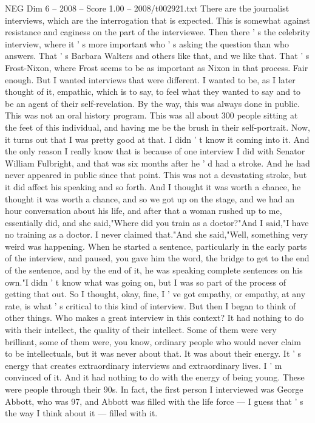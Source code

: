 \begin{textsample}{NEG Dim 6 – 2008 – Score 1.00 – 2008/t002921.txt}
There are the journalist interviews, which are the interrogation that is expected.
This is somewhat against resistance and caginess on the part of the interviewee.
Then there ' s the celebrity interview, where it ' s more important who ' s asking the question than who answers.
That ' s Barbara Walters and others like that, and we like that.
That ' s Frost-Nixon, where Frost seems to be as important as Nixon in that process.
Fair enough.
But I wanted interviews that were different.
I wanted to be, as I later thought of it, empathic, which is to say, to feel what they wanted to say and to be an agent of their self-revelation.
By the way, this was always done in public.
This was not an oral history program.
This was all about 300 people sitting at the feet of this individual, and having me be the brush in their self-portrait.
Now, it turns out that I was pretty good at that.
I didn ' t know it coming into it.
And the only reason I really know that is because of one interview I did with Senator William Fulbright, and that was six months after he ' d had a stroke.
And he had never appeared in public since that point.
This was not a devastating stroke, but it did affect his speaking and so forth.
And I thought it was worth a chance, he thought it was worth a chance, and so we got up on the stage, and we had an hour conversation about his life, and after that a woman rushed up to me, essentially did, and she said,"Where did you train as a doctor?"And I said,"I have no training as a doctor.
I never claimed that."And she said,"Well, something very weird was happening.
When he started a sentence, particularly in the early parts of the interview, and paused, you gave him the word, the bridge to get to the end of the sentence, and by the end of it, he was speaking complete sentences on his own."I didn ' t know what was going on, but I was so part of the process of getting that out.
So I thought, okay, fine, I ' ve got empathy, or empathy, at any rate, is what ' s critical to this kind of interview.
But then I began to think of other things.
Who makes a great interview in this context?
It had nothing to do with their intellect, the quality of their intellect.
Some of them were very brilliant, some of them were, you know, ordinary people who would never claim to be intellectuals, but it was never about that.
It was about their energy.
It ' s energy that creates extraordinary interviews and extraordinary lives.
I ' m convinced of it.
And it had nothing to do with the energy of being young.
These were people through their 90s.
In fact, the first person I interviewed was George Abbott, who was 97, and Abbott was filled with the life force — I guess that ' s the way I think about it — filled with it.

\end{textsample}
